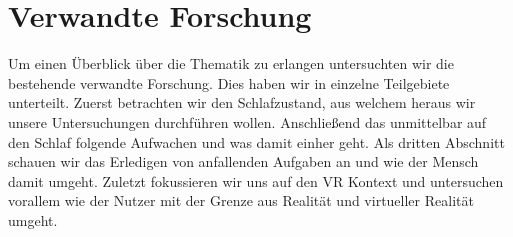 \chapter{Verwandte Forschung}\label{sec:relatedWork}
Um einen Überblick über die Thematik zu erlangen untersuchten wir die bestehende verwandte Forschung. Dies haben wir in einzelne Teilgebiete unterteilt. Zuerst betrachten wir den Schlafzustand, aus welchem heraus wir unsere Untersuchungen durchführen wollen. Anschließend das unmittelbar auf den Schlaf folgende Aufwachen und was damit einher geht. Als dritten Abschnitt schauen wir das Erledigen von anfallenden Aufgaben an und wie der Mensch damit umgeht. Zuletzt fokussieren wir uns auf den VR Kontext und untersuchen vorallem wie der Nutzer mit der Grenze aus Realität und virtueller Realität umgeht.\\